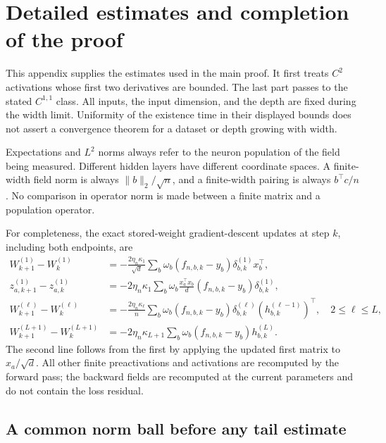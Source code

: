 \section{Detailed estimates and completion of the proof}
\label{app:proof}

This appendix supplies the estimates used in the main proof.  It first treats
$C^2$ activations whose first two derivatives are bounded.  The last part
passes to the stated $C^{1,1}$ class.  All inputs, the input dimension, and
the depth are fixed during the width limit.  Uniformity of the existence
time in their displayed bounds does not assert a convergence theorem for
a dataset or depth growing with width.

Expectations and $L^2$ norms always refer to the neuron population of the
field being measured.  Different hidden layers have different coordinate
spaces.  A finite-width field norm is always $\|b\|_2/\sqrt n$, and a
finite-width pairing is always $b^\top c/n$.  No comparison in operator
norm is made between a finite matrix and a population operator.

For completeness, the exact stored-weight gradient-descent updates at
step $k$, including both endpoints, are
\begin{align*}
 W_{k+1}^{(1)}-W_k^{(1)}
 &=-\frac{2\eta_n\kappa_1}{\sqrt d}
   \sum_b\omega_b(f_{n,b,k}-y_b)\delta_{b,k}^{(1)}x_b^\top,\\
 z_{a,k+1}^{(1)}-z_{a,k}^{(1)}
 &=-2\eta_n\kappa_1\sum_b\omega_b\frac{x_a^\top x_b}{d}
                   (f_{n,b,k}-y_b)\delta_{b,k}^{(1)},\\
 W_{k+1}^{(\ell)}-W_k^{(\ell)}
 &=-\frac{2\eta_n\kappa_\ell}{n}
   \sum_b\omega_b(f_{n,b,k}-y_b)
       \delta_{b,k}^{(\ell)}(h_{b,k}^{(\ell-1)})^\top,
       \quad 2\le\ell\le L,\\
 W_{k+1}^{(L+1)}-W_k^{(L+1)}
 &=-2\eta_n\kappa_{L+1}\sum_b\omega_b(f_{n,b,k}-y_b)h_{b,k}^{(L)}.
\end{align*}
The second line follows from the first by applying the updated first
matrix to $x_a/\sqrt d$.  All other finite preactivations and activations
are recomputed by the forward pass; the backward fields are recomputed
at the current parameters and do not contain the loss residual.

\subsection{A common norm ball before any tail estimate}
\label{app:norm-ball}

